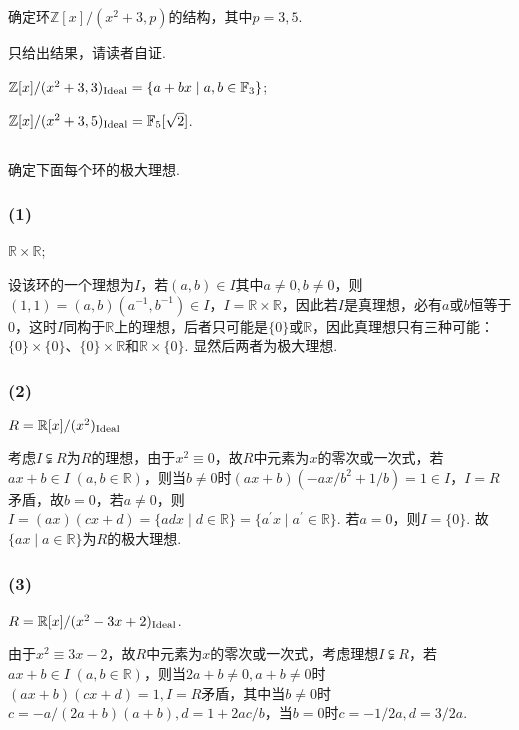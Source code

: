 \subsection{}
确定环$\mathbb{Z}[x]/(x^2+3, p)$的结构，其中$p=3,5$.

\jie 只给出结果，请读者自证.

$\mathbb{Z}[x]/(x^2+3,3)_{\operatorname{Ideal}}=\{a+bx\mid a,b\in\mathbb{F}_3\}$;

$\mathbb{Z}[x]/(x^2+3,5)_{\operatorname{Ideal}}=\mathbb{F}_5[\sqrt{2}]$.

\subsection{}
确定下面每个环的极大理想.
\subsubsection{(1)}
$\mathbb{R}\times\mathbb{R}$;

\jie 设该环的一个理想为$I$，若$(a,b)\in I$其中$a\neq 0, b\neq 0$，则$(1,1)=(a,b)(a^{-1},b^{-1})\in I$，$I=\mathbb{R}\times\mathbb{R}$，因此若$I$是真理想，必有$a$或$b$恒等于$0$，这时$I$同构于$\mathbb{R}$上的理想，后者只可能是$\{0\}$或$\mathbb{R}$，因此真理想只有三种可能：$\{0\}\times\{0\}$、$\{0\}\times\mathbb{R}$和$\mathbb{R}\times\{0\}$. 显然后两者为极大理想.

\subsubsection{(2)}
$R=\mathbb{R}[x]/(x^2)_{\operatorname{Ideal}}$

\jie 考虑$I\subsetneqq R$为$R$的理想，由于$x^2\equiv 0$，故$R$中元素为$x$的零次或一次式，若$ax+b\in I\;(a,b\in\mathbb{R})$，则当$b\neq 0$时$(ax+b)(-ax/b^2+1/b)=1\in I$，$I=R$矛盾，故$b=0$，若$a\neq 0$，则$I=(ax)(cx+d)=\{adx\mid d\in \mathbb{R}\}=\{a^{\prime}x\mid a^{\prime}\in\mathbb{R}\}$. 若$a=0$，则$I=\{0\}$. 故$\{ax\mid a\in\mathbb{R}\}$为$R$的极大理想.

\subsubsection{(3)}
$R=\mathbb{R}[x]/(x^2-3x+2)_{\operatorname{Ideal}}$.

\jie 由于$x^2\equiv 3x-2$，故$R$中元素为$x$的零次或一次式，考虑理想$I\subsetneqq R$，若$ax+b\in I\;(a,b\in\mathbb{R})$，则当$2a+b\neq 0, a+b\neq 0$时$(ax+b)(cx+d)=1, I=R$矛盾，其中当$b\neq 0$时$c=-a/(2a+b)(a+b), d=1+2ac/b$，当$b=0$时$c=-1/2a, d=3/2a$.

